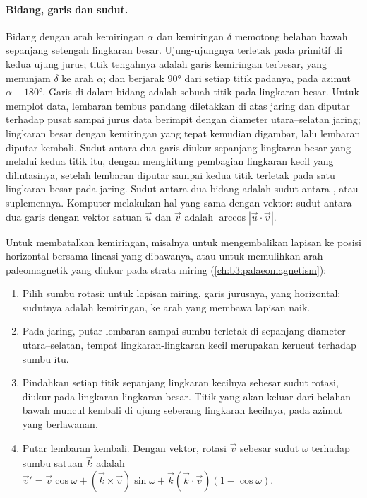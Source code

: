 \paragraph{Bidang, garis dan sudut.}
Bidang dengan arah kemiringan $\alpha$ dan kemiringan $\delta$ memotong belahan bawah
sepanjang setengah lingkaran besar. Ujung-ujungnya terletak pada primitif di kedua ujung
jurus; titik tengahnya adalah garis kemiringan terbesar, yang menunjam $\delta$
ke arah $\alpha$; dan  berjarak \ang{90} dari setiap titik padanya, pada
azimut $\alpha + \ang{180}$. Garis di dalam bidang adalah sebuah titik pada lingkaran besar.
Untuk memplot data, lembaran tembus pandang diletakkan di atas jaring dan diputar
terhadap pusat sampai jurus data berimpit dengan diameter utara--selatan jaring; lingkaran besar
dengan kemiringan yang tepat kemudian digambar, lalu lembaran diputar kembali.
Sudut antara dua garis diukur sepanjang lingkaran besar yang melalui kedua titik itu,
dengan menghitung pembagian lingkaran kecil yang dilintasinya, setelah lembaran
diputar sampai kedua titik terletak pada satu lingkaran besar pada jaring. Sudut antara
dua bidang adalah sudut antara , atau suplemennya.
Komputer melakukan hal yang sama dengan vektor: sudut antara dua garis dengan vektor satuan
$\vec u$ dan $\vec v$ adalah $\arccos|\vec u\cdot\vec v|$.

\begin{method}\label{met:b3:structural-analysis:rotation}
Untuk membatalkan kemiringan, misalnya untuk mengembalikan lapisan ke posisi
horizontal bersama lineasi yang dibawanya, atau untuk memulihkan arah paleomagnetik yang
diukur pada strata miring (\cref{ch:b3:palaeomagnetism}):
\begin{enumerate}
  \item Pilih sumbu rotasi: untuk lapisan miring, garis jurusnya,
        yang horizontal; sudutnya adalah kemiringan, ke arah yang membawa lapisan naik.
  \item Pada jaring, putar lembaran sampai sumbu terletak di sepanjang
        diameter utara--selatan, tempat lingkaran-lingkaran kecil merupakan kerucut
        terhadap sumbu itu.
  \item Pindahkan setiap titik sepanjang lingkaran kecilnya sebesar sudut rotasi,
        diukur pada lingkaran-lingkaran besar. Titik yang akan keluar dari belahan bawah
        muncul kembali di ujung seberang lingkaran kecilnya,
        pada azimut yang berlawanan.
  \item Putar lembaran kembali. Dengan vektor, rotasi $\vec v$ sebesar
        sudut $\omega$ terhadap sumbu satuan $\vec k$ adalah $\vec v' = \vec v
        \cos\omega + (\vec k\times\vec v)\sin\omega + \vec k(\vec k\cdot\vec
        v)(1 - \cos\omega)$.
\end{enumerate}
\end{method}

